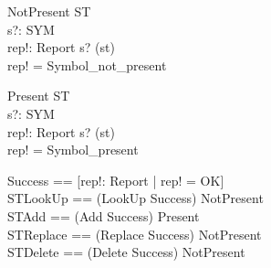 \begin{schema}{NotPresent}
  \Xi ST \\
  s?: SYM \\
  rep!: Report
\where
  s? \notin \dom(st) \\
  rep! = Symbol\_not\_present
\end{schema}

\begin{schema}{Present}
  \Xi ST \\
  s?: SYM \\
  rep!: Report
\where
  s? \in \dom(st) \\
  rep! = Symbol\_present
\end{schema}

\begin{zed}
Success == [rep!: Report | rep! = OK] \\
STLookUp == (LookUp \land Success) \lor NotPresent \\
STAdd == (Add \land Success) \lor Present \\
STReplace == (Replace \land Success) \lor NotPresent \\
STDelete == (Delete \land Success) \lor NotPresent \\
\end{zed}
